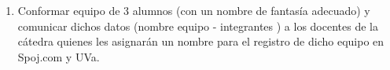 \begin{enumerate}[1 -]
	\item  Conformar equipo de 3 alumnos (con un nombre de fantasía adecuado) y comunicar dichos datos (nombre equipo - integrantes ) a los docentes de la cátedra quienes les asignarán un nombre para el registro de dicho equipo en Spoj.com y UVa.

\end{enumerate}






